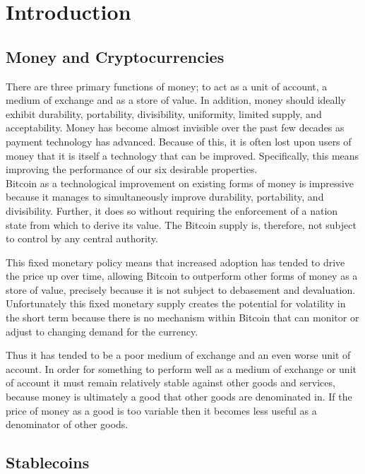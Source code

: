 \section{Introduction}

\subsection{Money and Cryptocurrencies}

There are three primary functions of money; to act as a unit of account, a medium of exchange
and as a store of value. In addition, money should ideally exhibit durability,
portability, divisibility, uniformity, limited supply, and acceptability.
Money has become almost invisible over the past few decades as payment technology has advanced.
Because of this, it is often lost upon users of money that it is itself a technology that can be
improved. Specifically, this means improving the performance of our six desirable properties. \\

\noindent Bitcoin as a technological improvement on existing forms of money is impressive because it manages to
simultaneously improve durability, portability, and divisibility.
Further, it does so without requiring the enforcement of a nation state from which to derive its value.
The Bitcoin supply is, therefore, not subject to control by any central authority.

This fixed monetary policy means that increased adoption has tended to drive the price up over time,
allowing Bitcoin to outperform other forms of money as a store of value, precisely because it is not
subject to debasement and devaluation. Unfortunately this fixed monetary supply creates the potential
for volatility in the short term because there is no mechanism within Bitcoin that can monitor or
adjust to changing demand for the currency.

Thus it has tended to be a poor medium of exchange and an even worse unit of account.
In order for something to perform well as a medium of exchange or unit of account it must remain
relatively stable against other goods and services, because money is ultimately a good that other goods
are denominated in. If the price of money as a good is too variable then it becomes less useful as a
denominator of other goods. \\

\subsection{Stablecoins}

